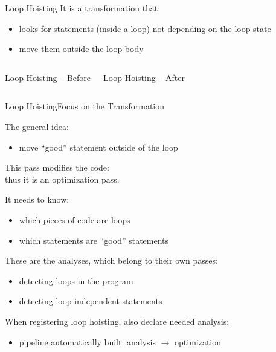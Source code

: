 \documentclass[10pt,mathserif]{beamer}
\begin{document}
\begin{frame}{Loop Hoisting}
It is a transformation that:
\begin{itemize}
\item looks for statements (inside a loop) not depending on the loop state
\item move them outside the loop body
\end{itemize}

\begin{columns}[t]
\begin{block}{Loop Hoisting -- Before}
\centering
{}
\end{block}

\begin{block}{Loop Hoisting -- After}
\centering
{}
\end{block}
\end{columns}
\end{frame}


\begin{frame}{Loop Hoisting}{Focus on the Transformation}
\begin{block}{The general idea:}
\begin{itemize}
\item move ``good'' statement outside of the loop
\end{itemize}
\end{block}

This \alert{pass} modifies the code: \\
thus it is an \alert{optimization pass}.

It needs to know:
\begin{itemize}
\item which pieces of code are loops
\item which statements are ``good'' statements
\end{itemize}

These are the \alert{analyses}, which belong to their own passes:

\begin{itemize}
\item detecting loops in the program
\item detecting loop-independent statements
\end{itemize}

When registering loop hoisting, also declare needed analysis:

\begin{itemize}
\item pipeline automatically built: \alert{analysis $\rightarrow$ optimization}
\end{itemize}
\end{frame}
\end{document}
